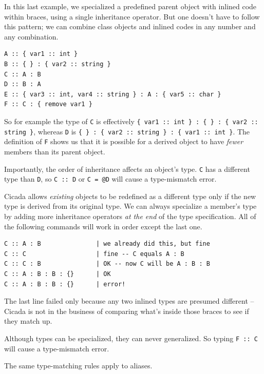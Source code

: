 \documentclass{article}
\newenvironment{code}{
       \begin{list}{}{
               \setlength{\leftmargin}{.4in}
               \setlength{\rightmargin}{0in}
               \setlength{\topsep}{.2in}
       }
       \small
       \item[] }
       { \end{list}   }
\begin{document}
In this last example, we specialized a predefined parent object with inlined code within braces, using a single inheritance operator.  But one doesn't have to follow this pattern; we can combine class objects and inlined codes in any number and any combination.

\begin{code} \begin{verbatim}
A :: { var1 :: int }
B :: { } : { var2 :: string }
C :: A : B
D :: B : A
E :: { var3 :: int, var4 :: string } : A : { var5 :: char }
F :: C : { remove var1 }
\end{verbatim} \end{code}

\noindent So for example the type of \verb#C# is effectively \verb#{ var1 :: int } : { } : { var2 :: string }#, whereas \verb#D# is \verb#{ } : { var2 :: string } : { var1 :: int }#.  The definition of \verb#F# shows us that it is possible for a derived object to have \emph{fewer} members than its parent object.

Importantly, the order of inheritance affects an object's type.  \verb#C# has a different type than \verb#D#, so \verb#C :: D# or \verb#C = @D# will cause a type-mismatch error.

Cicada allows \emph{existing} objects to be redefined as a different type only if the new type is derived from its original type.  We can always specialize a member's type by adding more inheritance operators \emph{at the end} of the type specification.  All of the following commands will work in order except the last one.

\begin{code} \begin{verbatim}
C :: A : B               | we already did this, but fine
C :: C                   | fine -- C equals A : B
C :: C : B               | OK -- now C will be A : B : B
C :: A : B : B : {}      | OK
C :: A : B : B : {}      | error!
\end{verbatim} \end{code}

\noindent The last line failed only because any two inlined types are presumed different -- Cicada is not in the business of comparing what's inside those braces to see if they match up.

Although types can be specialized, they can never generalized.  So typing \verb#F :: C# will cause a type-mismatch error.

The same type-matching rules apply to aliases.
\end{document}
